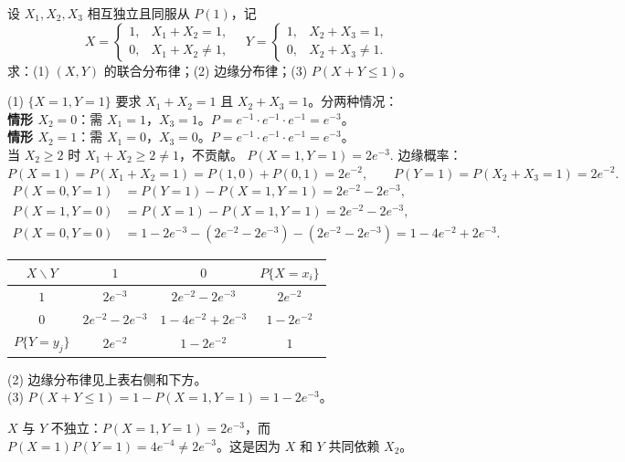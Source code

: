 \documentclass[lang=cn,11pt]{elegantbook}
\begin{document}
\begin{exercise}[泊松变量的复合函数] \label{exer:3-d4}
设 $X_1,X_2,X_3$ 相互独立且同服从 $P(1)$，记
\[
X = \begin{cases} 1, & X_1+X_2=1, \\ 0, & X_1+X_2\neq 1, \end{cases} \quad Y = \begin{cases} 1, & X_2+X_3=1, \\ 0, & X_2+X_3\neq 1. \end{cases}
\]
求：(1) $(X,Y)$ 的联合分布律；(2) 边缘分布律；(3) $P(X+Y \leqslant 1)$。
\end{exercise}
\begin{solution}
(1) $\{X=1,Y=1\}$ 要求 $X_1+X_2=1$ 且 $X_2+X_3=1$。分两种情况：\\
\textbf{情形 $X_2=0$}：需 $X_1=1$，$X_3=1$。$P = e^{-1}\cdot e^{-1}\cdot e^{-1} = e^{-3}$。\\
\textbf{情形 $X_2=1$}：需 $X_1=0$，$X_3=0$。$P = e^{-1}\cdot e^{-1}\cdot e^{-1} = e^{-3}$。\\
当 $X_2 \geqslant 2$ 时 $X_1+X_2 \geqslant 2 \neq 1$，不贡献。
\(
P(X=1,Y=1) = 2e^{-3}.
\)
边缘概率：
\(
P(X=1) = P(X_1+X_2=1) = P(1,0)+P(0,1) = 2e^{-2}, \qquad P(Y=1) = P(X_2+X_3=1) = 2e^{-2}.
\)
\begin{align*}
P(X=0,Y=1) &= P(Y=1)-P(X=1,Y=1) = 2e^{-2}-2e^{-3}, \\
P(X=1,Y=0) &= P(X=1)-P(X=1,Y=1) = 2e^{-2}-2e^{-3}, \\
P(X=0,Y=0) &= 1-2e^{-3}-(2e^{-2}-2e^{-3})-(2e^{-2}-2e^{-3}) = 1-4e^{-2}+2e^{-3}.
\end{align*}
\begin{center}
\begin{tabular}{c|cc|c}
\toprule
$X \backslash Y$ & $1$ & $0$ & $P\{X=x_i\}$ \\
\midrule
$1$ & $2e^{-3}$ & $2e^{-2}-2e^{-3}$ & $2e^{-2}$ \\
$0$ & $2e^{-2}-2e^{-3}$ & $1-4e^{-2}+2e^{-3}$ & $1-2e^{-2}$ \\
\midrule
$P\{Y=y_j\}$ & $2e^{-2}$ & $1-2e^{-2}$ & $1$ \\
\bottomrule
\end{tabular}
\end{center}
(2) 边缘分布律见上表右侧和下方。\\
(3) $P(X+Y \leqslant 1) = 1-P(X=1,Y=1) = 1-2e^{-3}$。
\begin{note}
$X$ 与 $Y$ 不独立：$P(X=1,Y=1)=2e^{-3}$，而 $P(X=1)P(Y=1)=4e^{-4} \neq 2e^{-3}$。这是因为 $X$ 和 $Y$ 共同依赖 $X_2$。
\end{note}
\end{solution}
\end{document}
